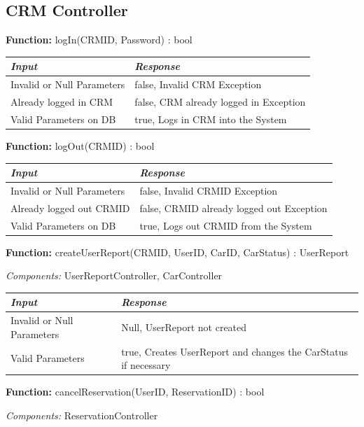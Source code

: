 \documentclass[a4paper]{article}
\begin{document}
\subsection{CRM Controller}
\textbf{Function:} logIn(CRMID, Password) : bool \par
\begin{center}
\begin{tabular}{ | L{6cm} | L{6cm} | }
\hline
	\textit{Input}& \textit{Response}\\ \hline
	Invalid or Null Parameters & false, Invalid CRM Exception\\ \hline
	Already logged in CRM & false, CRM already logged in Exception\\ \hline
	Valid Parameters on DB & true, Logs in CRM into the System \\ \hline
\end{tabular}
\end{center}
\textbf{Function:} logOut(CRMID) : bool \par
\begin{center}
\begin{tabular}{ | L{6cm} | L{6cm} | }
\hline
	\textit{Input}& \textit{Response}\\ \hline
	Invalid or Null Parameters & false, Invalid CRMID Exception\\ \hline
	Already logged out CRMID & false, CRMID already logged out Exception\\ \hline
	Valid Parameters on DB & true, Logs out CRMID from the System \\ \hline
\end{tabular}
\end{center}
\textbf{Function:} createUserReport(CRMID, UserID, CarID, CarStatus) : UserReport \par
\textit{Components:} UserReportController, CarController
\begin{center}
\begin{tabular}{ | L{6cm} | L{6cm} | }
\hline
	\textit{Input}& \textit{Response}\\ \hline
	Invalid or Null Parameters & Null, UserReport not created\\ \hline
	Valid Parameters & true, Creates UserReport and changes the CarStatus if necessary\\ \hline
\end{tabular}
\end{center}
\textbf{Function:} cancelReservation(UserID, ReservationID) : bool \par
\textit{Components:} ReservationController
\end{document}
